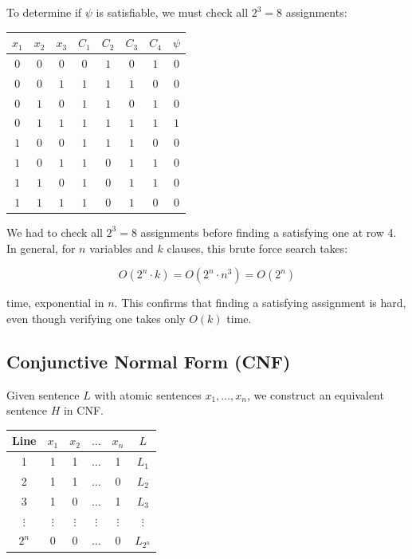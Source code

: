 \documentclass[12pt,a4paper,openany]{article}
\begin{document}
To determine if $\psi$ is satisfiable, we must check all $2^3 = 8$ assignments:

\begin{center}
\begin{tabular}{ccc|cccc|c}
$x_1$ & $x_2$ & $x_3$ & $C_1$ & $C_2$ & $C_3$ & $C_4$ & $\psi$ \\ \hline
$0$ & $0$ & $0$ & $0$ & $1$ & $0$ & $1$ & $0$ \\
$0$ & $0$ & $1$ & $1$ & $1$ & $1$ & $0$ & $0$ \\
$0$ & $1$ & $0$ & $1$ & $1$ & $0$ & $1$ & $0$ \\
$0$ & $1$ & $1$ & $1$ & $1$ & $1$ & $1$ & $1$ \\
$1$ & $0$ & $0$ & $1$ & $1$ & $1$ & $0$ & $0$ \\
$1$ & $0$ & $1$ & $1$ & $0$ & $1$ & $1$ & $0$ \\
$1$ & $1$ & $0$ & $1$ & $0$ & $1$ & $1$ & $0$ \\
$1$ & $1$ & $1$ & $1$ & $0$ & $1$ & $0$ & $0$ \\
\end{tabular}
\end{center}

We had to check all $2^3 = 8$ assignments before finding a satisfying one at row 4.
In general, for $n$ variables and $k$ clauses, this brute force search takes:

\[
O(2^n \cdot k) = O(2^n \cdot n^3) = O(2^n)
\]

time, exponential in $n$. This confirms that finding a satisfying assignment is hard, even
though verifying one takes only $O(k)$ time.

\subsection{Conjunctive Normal Form (CNF)}

Given sentence $L$ with atomic sentences $x_1, \dots, x_n$, we
construct an equivalent sentence $H$ in CNF.

\begin{center}
\begin{tabular}{|c|c|c|c|c|c|}
\hline
Line & $x_1$ & $x_2$ & $\dots$ & $x_n$ & $L$ \\
\hline
1 & 1 & 1 & $\dots$ & 1 & $L_1$ \\
\hline
2 & 1 & 1 & $\dots$ & 0 & $L_2$ \\
\hline
3 & 1 & 0 & $\dots$ & 1 & $L_3$ \\
\hline
$\vdots$ & $\vdots$ & $\vdots$ & $\vdots$ & $\vdots$ & $\vdots$ \\
\hline
$2^n$ & 0 & 0 & $\dots$ & 0 & $L_{2^n}$ \\
\hline
\end{tabular}
\end{center}
\end{document}
